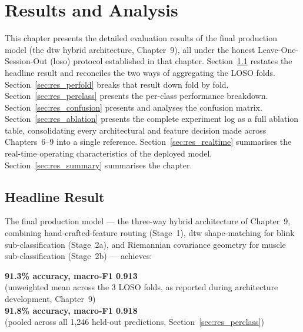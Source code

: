 \chapter{Results and Analysis}
\label{ch:results}

This chapter presents the detailed evaluation results of the final
production model (the \acrshort{dtw} hybrid architecture,
Chapter~9), all under the honest Leave-One-Session-Out
(\acrshort{loso}) protocol established in that chapter.
Section~\ref{sec:res_headline} restates the headline result and
reconciles the two ways of aggregating the LOSO folds.
Section~\ref{sec:res_perfold} breaks that result down fold by
fold. Section~\ref{sec:res_perclass} presents the per-class
performance breakdown. Section~\ref{sec:res_confusion} presents
and analyses the confusion matrix. Section~\ref{sec:res_ablation}
presents the complete experiment log as a full ablation table,
consolidating every architectural and feature decision made across
Chapters~6--9 into a single reference. Section~\ref{sec:res_realtime}
summarises the real-time operating characteristics of the deployed
model. Section~\ref{sec:res_summary} summarises the chapter.

\section{Headline Result}
\label{sec:res_headline}

The final production model --- the three-way hybrid architecture
of Chapter~9, combining hand-crafted-feature routing (Stage~1),
\acrshort{dtw} shape-matching for blink sub-classification
(Stage~2a), and Riemannian covariance geometry for muscle
sub-classification (Stage~2b) --- achieves:

\begin{center}
\Large \textbf{91.3\% accuracy, macro-F1 0.913}\\
\normalsize (unweighted mean across the 3 LOSO folds, as reported
during architecture development, Chapter~9)\\[4pt]
\Large \textbf{91.8\% accuracy, macro-F1 0.918}\\
\normalsize (pooled across all 1{,}246 held-out predictions,
Section~\ref{sec:res_perclass})
\end{center}

